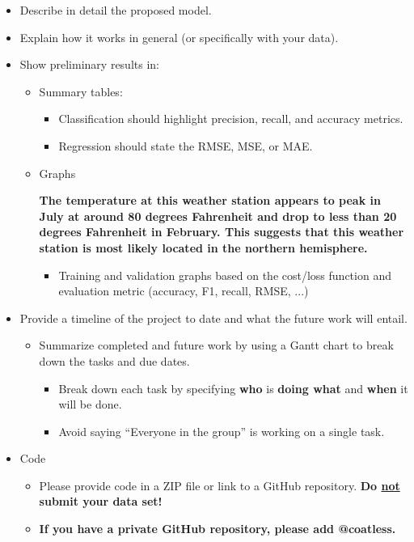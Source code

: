 \documentclass[conference]{IEEEtran}
\begin{document}
\begin{itemize}
  \item Describe in detail the proposed model.
  \item Explain how it works in general (or specifically with your data).
  \item Show preliminary results in:
  \begin{itemize}
    \item Summary tables:
    \begin{itemize}
      \item Classification should highlight precision, recall, and accuracy metrics.
      \item Regression should state the RMSE, MSE, or MAE.
    \end{itemize}
    \item Graphs

    \textbf{The temperature at this weather station appears to peak in July at around 80 degrees Fahrenheit and drop to less than 20 degrees Fahrenheit in February. This suggests that this weather station is most likely located in the northern hemisphere.} \\

    \begin{itemize}
      \item Training and validation graphs based on the cost/loss function and evaluation metric (accuracy, F1, recall, RMSE, ...)
    \end{itemize}
  \end{itemize}
  \item Provide a timeline of the project to date and what the future work will entail.
  \begin{itemize}
    \item Summarize completed and future work by using a Gantt chart to break down the tasks and due dates.
    \begin{itemize}
      \item Break down each task by specifying \textbf{who} is \textbf{doing what} and \textbf{when} it will be done.
      \item Avoid saying ``Everyone in the group'' is working on a single task.
    \end{itemize}
  \end{itemize}
  \item Code
  \begin{itemize}
    \item Please provide code in a ZIP file or link to a GitHub repository. \textbf{Do \underline{not} submit your data set!}
    \item \textbf{If you have a private GitHub repository, please add @coatless.}
  \end{itemize}
\end{itemize}
\end{document}
